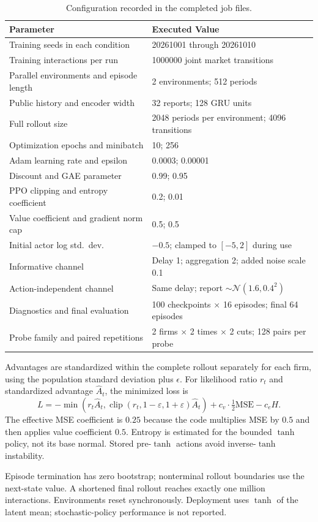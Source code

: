 \begin{table}[t]
\centering
\caption{Configuration recorded in the completed job files.}
\label{tab:config}
\small
\begin{tabular}{@{}ll@{}}
\toprule
Parameter & Executed Value \\
\midrule
Training seeds in each condition & 20261001 through 20261010 \\
Training interactions per run & \num{1000000} joint market transitions \\
Parallel environments and episode length & 2 environments; 512 periods \\
Public history and encoder width & 32 reports; 128 GRU units \\
Full rollout size & \num{2048} periods per environment; \num{4096} transitions \\
Optimization epochs and minibatch & 10; 256 \\
Adam learning rate and epsilon & \num{0.0003}; \num{0.00001} \\
Discount and GAE parameter & 0.99; 0.95 \\
PPO clipping and entropy coefficient & 0.2; 0.01 \\
Value coefficient and gradient norm cap & 0.5; 0.5 \\
Initial actor log std.\ dev. & $-0.5$; clamped to $[-5, 2]$ during use \\
Informative channel & Delay 1; aggregation 2; added noise scale 0.1 \\
Action-independent channel & Same delay; report $\sim \mathcal{N}(1.6, 0.4^2)$ \\
Diagnostics and final evaluation & 100 checkpoints $\times$ 16 episodes; final 64 episodes \\
Probe family and paired repetitions & 2 firms $\times$ 2 times $\times$ 2 cuts; 128 pairs per probe \\
\bottomrule
\end{tabular}
\end{table}

Advantages are standardized within the complete rollout separately for each firm, using the population standard deviation plus $\epsilon$. For likelihood ratio $r_t$ and standardized advantage $\hat{A}_t$, the minimized loss is
\[
L = -\min(r_t \hat{A}_t, \operatorname{clip}(r_t, 1-\varepsilon, 1+\varepsilon)\hat{A}_t) + c_v \cdot \tfrac{1}{2} \mathrm{MSE} - c_e H.
\]
The effective MSE coefficient is $0.25$ because the code multiplies MSE by $0.5$ and then applies value coefficient $0.5$. Entropy is estimated for the bounded $\tanh$ policy, not its base normal. Stored pre-$\tanh$ actions avoid inverse-$\tanh$ instability.

Episode termination has zero bootstrap; nonterminal rollout boundaries use the next-state value. A shortened final rollout reaches exactly one million interactions. Environments reset synchronously. Deployment uses $\tanh$ of the latent mean; stochastic-policy performance is not reported.

